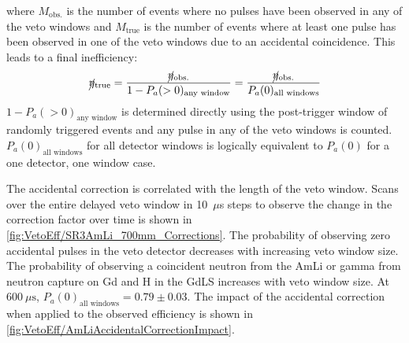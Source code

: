 where $M_\text{obs.}$ is the number of events where no pulses have been observed in any of the veto windows and $M_\text{true}$ is the number of events where at least one pulse has been observed in one of the veto windows due to an accidental coincidence.
This leads to a final inefficiency:
\begin{equation}
	\cancel{\eta}_\text{true} = \frac{\cancel{\eta}_\text{obs.}}{1-P_a(>0)_{\text{any window}}}=\frac{\cancel{\eta}_\text{obs.}}{P_a(0)_{\text{all windows}}}
\end{equation}
$1-P_a(>0)_{\text{any window}}$ is determined directly using the post-trigger window of randomly triggered events and any pulse in any of the veto windows is counted. $P_a(0)_{\text{all windows}}$ for all detector windows is logically equivalent to $P_a(0)$ for a one detector, one window case.

The accidental correction is correlated with the length of the veto window. Scans over the entire delayed veto window in 10~$\mu$s steps to observe the change in the correction factor over time is shown in \autoref{fig:VetoEff/SR3AmLi_700mm_Corrections}. The probability of observing zero accidental pulses in the veto detector decreases with increasing veto window size. The probability of observing a coincident neutron from the AmLi or gamma from neutron capture on Gd and H in the GdLS increases with veto window size. At $600~\mu\text{s}$, $P_a(0)_{\text{all windows}}=0.79\pm0.03$. 
The impact of the accidental correction when applied to the observed efficiency is shown in \autoref{fig:VetoEff/AmLiAccidentalCorrectionImpact}.

